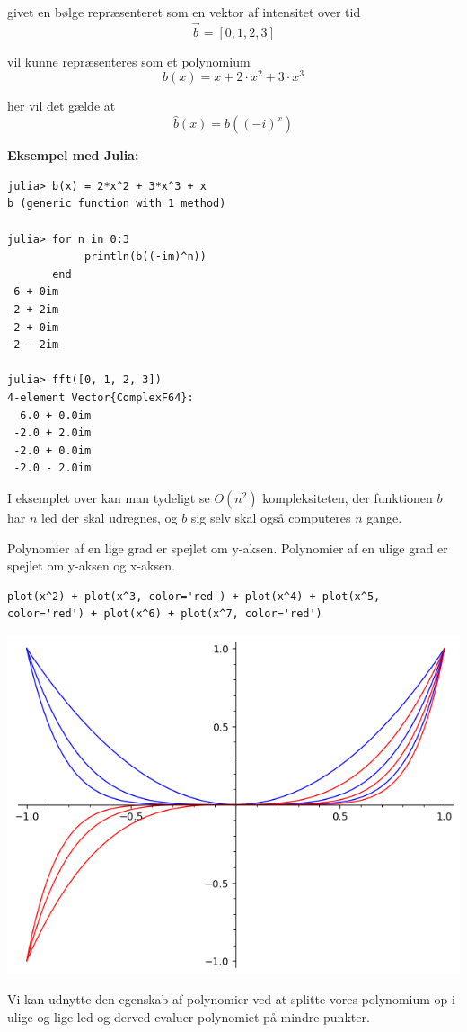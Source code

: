 \documentclass[11pt,a4paper]{article}
\begin{document}
givet en bølge repræsenteret som en vektor af intensitet over tid
$$
\vec{b} = [0, 1, 2, 3]
$$

vil kunne repræsenteres som et polynomium
$$
b(x) = x + 2\cdot x^2 + 3\cdot x^3
$$

her vil det gælde at
$$
\hat{b}(x) = b((-i)^x)
$$

\textbf{Eksempel med Julia:}
\begin{verbatim}
julia> b(x) = 2*x^2 + 3*x^3 + x
b (generic function with 1 method)

julia> for n in 0:3
            println(b((-im)^n))
       end
 6 + 0im
-2 + 2im
-2 + 0im
-2 - 2im

julia> fft([0, 1, 2, 3])
4-element Vector{ComplexF64}:
  6.0 + 0.0im
 -2.0 + 2.0im
 -2.0 + 0.0im
 -2.0 - 2.0im
\end{verbatim}

I eksemplet over kan man tydeligt se \(O(n^2)\) kompleksiteten,
der funktionen \(b\) har \(n\) led der skal udregnes,
og \(b\) sig selv skal også computeres \(n\) gange.

Polynomier af en lige grad er spejlet om y-aksen.
Polynomier af en ulige grad er spejlet om y-aksen og x-aksen.

\begin{verbatim}
plot(x^2) + plot(x^3, color='red') + plot(x^4) + plot(x^5, color='red') + plot(x^6) + plot(x^7, color='red')
\end{verbatim}

\begin{center}
\includegraphics[width=.9\linewidth]{even_and_odd.png}
\end{center}

Vi kan udnytte den egenskab af polynomier ved at splitte vores polynomium op i ulige og lige led
og derved evaluer polynomiet på mindre punkter.
\end{document}
